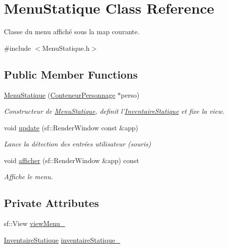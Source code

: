 \hypertarget{classMenuStatique}{\section{Menu\-Statique Class Reference}
\label{classMenuStatique}
}


Classe du menu affiché sous la map courante.  




{\ttfamily \#include $<$Menu\-Statique.\-h$>$}

\subsection*{Public Member Functions}
\begin{DoxyCompactItemize}
\item 
\hyperlink{classMenuStatique_aedb0c7d0fb7f30e9cc37fbe88cc28d16}{Menu\-Statique} (\hyperlink{classConteneurPersonnage}{Conteneur\-Personnage} $\ast$perso)
\begin{DoxyCompactList}\small\item\em Constructeur de \hyperlink{classMenuStatique}{Menu\-Statique}, definit l'\hyperlink{classInventaireStatique}{Inventaire\-Statique} et fixe la view. \end{DoxyCompactList}\item 
void \hyperlink{classMenuStatique_a5ed3172bd8b6a96e850020f1d85cfc00}{update} (sf\-::\-Render\-Window const \&app)
\begin{DoxyCompactList}\small\item\em Lance la détection des entrées utilisateur (souris) \end{DoxyCompactList}\item 
void \hyperlink{classMenuStatique_a8ec5aa4019c4f07943ef51113fda6985}{afficher} (sf\-::\-Render\-Window \&app) const 
\begin{DoxyCompactList}\small\item\em Affiche le menu. \end{DoxyCompactList}\end{DoxyCompactItemize}
\subsection*{Private Attributes}
\begin{DoxyCompactItemize}
\item 
sf\-::\-View \hyperlink{classMenuStatique_af2673da57cc312dd087610d79866e0d0}{view\-Menu\-\_\-}
\item 
\hyperlink{classInventaireStatique}{Inventaire\-Statique} \hyperlink{classMenuStatique_a48d87feb8de5baafb4ba5881b3d2b67f}{inventaire\-Statique\-\_\-}
\end{DoxyCompactItemize}


